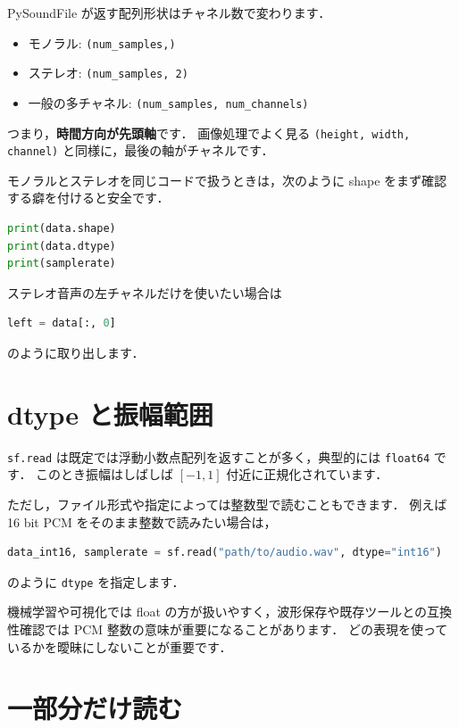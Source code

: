 PySoundFile が返す配列形状はチャネル数で変わります．

\begin{itemize}
\item モノラル: \texttt{(num\_samples,)}
\item ステレオ: \texttt{(num\_samples, 2)}
\item 一般の多チャネル: \texttt{(num\_samples, num\_channels)}
\end{itemize}

つまり，\textbf{時間方向が先頭軸}です．
画像処理でよく見る \texttt{(height, width, channel)} と同様に，最後の軸がチャネルです．

モノラルとステレオを同じコードで扱うときは，次のように shape をまず確認する癖を付けると安全です．

\begin{lstlisting}[style=codecell,language=Python]
print(data.shape)
print(data.dtype)
print(samplerate)
\end{lstlisting}

ステレオ音声の左チャネルだけを使いたい場合は
\begin{lstlisting}[style=codecell,language=Python]
left = data[:, 0]
\end{lstlisting}
のように取り出します．


\section{dtype と振幅範囲}

\texttt{sf.read} は既定では浮動小数点配列を返すことが多く，典型的には \texttt{float64} です．
このとき振幅はしばしば $[-1, 1]$ 付近に正規化されています．

ただし，ファイル形式や指定によっては整数型で読むこともできます．
例えば 16 bit PCM をそのまま整数で読みたい場合は，

\begin{lstlisting}[style=codecell,language=Python]
data_int16, samplerate = sf.read("path/to/audio.wav", dtype="int16")
\end{lstlisting}

のように \texttt{dtype} を指定します．

機械学習や可視化では float の方が扱いやすく，波形保存や既存ツールとの互換性確認では PCM 整数の意味が重要になることがあります．
どの表現を使っているかを曖昧にしないことが重要です．


\section{一部分だけ読む}

